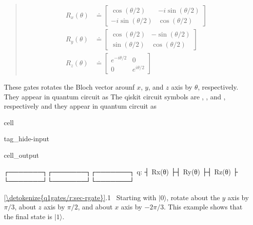 \documentclass[letterpaper,10pt,english]{jupyterBook}
\begin{document}
\sphinxAtStartPar
{}
\begin{quote}
\begin{align}
R_x(\theta) &\doteq \begin{bmatrix} \cos(\theta/2) & -i \sin(\theta/2) \\ -i \sin(\theta/2)& \cos(\theta/2)\end{bmatrix} \\
R_y(\theta) &\doteq \begin{bmatrix} \cos(\theta/2) & - \sin(\theta/2) \\ \sin(\theta/2)& \cos(\theta/2)\end{bmatrix}\\
R_z(\theta) &\doteq \begin{bmatrix} e^{-i \theta/2} & 0 \\0 & e^{i \theta/2}\end{bmatrix}
\end{align}
\end{quote}

\sphinxAtStartPar
These gates rotates the Bloch vector arounf \(x\), \(y\), and \(z\) axis by \(\theta\), respectively. They appear in quantum circuit as
The qiskit circuit symbols are , , and , respectively and they appear in quantum circuit as

\begin{sphinxuseclass}{cell}
\begin{sphinxuseclass}{tag_hide-input}\begin{sphinxVerbatimOutput}

\begin{sphinxuseclass}{cell_output}
\begin{sphinxVerbatim}[commandchars=\\\{\}]
   ┌───────┐┌───────┐┌───────┐
q: ┤ Rx(θ) ├┤ Ry(θ) ├┤ Rz(θ) ├
   └───────┘└───────┘└───────┘
\end{sphinxVerbatim}

\end{sphinxuseclass}\end{sphinxVerbatimOutput}

\end{sphinxuseclass}
\end{sphinxuseclass}
\sphinxAtStartPar
{} \hyperref[\detokenize{q1gates/r:sec-rgate}]{\ref{\detokenize{q1gates/r:sec-rgate}}}.1   Starting with \(|0\rangle\), rotate about the \(y\) axis by \(\pi/3\), about \(z\) axis by \(\pi/2\), and about \(x\) axis by \(-2\pi/3\). This example shows that the final state is \(|1\rangle\).
\end{document}
